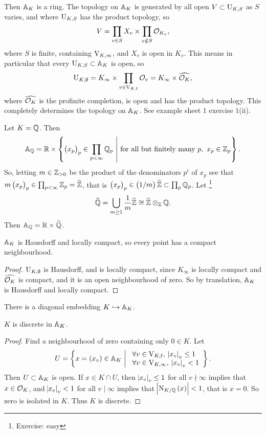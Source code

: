 Then $ \AA_K $ is a ring. The topology on $ \AA_K $ is generated by all open $ V \subset \U_{K, S} $ as $ S $ varies, and where $ \U_{K, S} $ has the product topology, so
$$ V = \prod_{v \in S} X_v \times \prod_{v \notin S} \OOO_{K_v}, $$
where $ S $ is finite, containing $ \V_{K, \infty} $, and $ X_v $ is open in $ K_v $. This means in particular that every $ \U_{K, S} \subset \AA_K $ is open, so
$$ \U_{K, \emptyset} = K_\infty \times \prod_{v \in \V_{K, \f}} \OOO_v = K_\infty \times \widehat{\OOO_K}, $$
where $ \widehat{\OOO_K} $ is the profinite completion, is open and has the product topology. This completely determines the topology on $ \AA_K $. See example sheet $ 1 $ exercise $ 1 $(ii).

\begin{example*}
Let $ K = \QQ $. Then
$$ \AA_\QQ = \RR \times \cbr{\br{x_p}_p \in \prod_{p < \infty} \QQ_p \st \text{for all but finitely many} \ p, \ x_p \in \ZZ_p}. $$
So, letting $ m \in \ZZ_{> 0} $ be the product of the denominators $ p^i $ of $ x_p $ see that $ m\br{x_p}_p \in \prod_{p < \infty} \ZZ_p = \widehat{\ZZ} $, that is $ \br{x_p}_p \in \br{1 / m}\widehat{\ZZ} \subset \prod_p \QQ_p $. Let \footnote{Exercise: easy}
$$ \widehat{\QQ} = \bigcup_{m \ge 1} \dfrac{1}{m}\widehat{\ZZ} \cong \widehat{\ZZ} \otimes_\ZZ \QQ. $$
Then $ \AA_\QQ = \RR \times \widehat{\QQ} $.
\end{example*}

\pagebreak

\begin{proposition}
$ \AA_K $ is Hausdorff and locally compact, so every point has a compact neighbourhood.
\end{proposition}

\begin{proof}
$ \U_{K, \emptyset} $ is Hausdorff, and is locally compact, since $ K_\infty $ is locally compact and $ \widehat{\OOO_K} $ is compact, and it is an open neighbourhood of zero. So by translation, $ \AA_K $ is Hausdorff and locally compact.
\end{proof}

There is a diagonal embedding $ K \hookrightarrow \AA_K $.

\begin{proposition}
$ K $ is discrete in $ \AA_K $.
\end{proposition}

\begin{proof}
Find a neighbourhood of zero containing only $ 0 \in K $. Let
$$ U = \cbr{x = \br{x_v} \in \AA_K \st \begin{array}{l} \forall v \in \V_{K, \f}, \ \abs{x_v}_v \le 1 \\ \forall v \in \V_{K, \infty}, \ \abs{x_v}_v < 1 \end{array}}. $$
Then $ U \subset \AA_K $ is open. If $ x \in K \cap U $, then $ \abs{x_v}_v \le 1 $ for all $ v \nmid \infty $ implies that $ x \in \OOO_K $, and $ \abs{x_v}_v < 1 $ for all $ v \mid \infty $ implies that $ \abs{\N_{K / \QQ}\br{x}} < 1 $, that is $ x = 0 $. So zero is isolated in $ K $. Thus $ K $ is discrete.
\end{proof}

